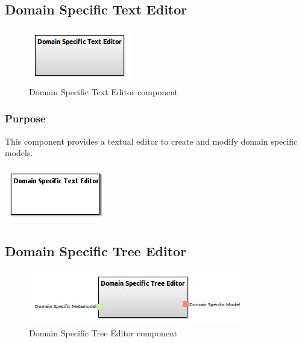 \documentclass{gemoc} %
\begin{document}
\subsection{Domain Specific Text Editor}

\begin{figure}[htp]
	\begin{center}
	\includegraphics*[trim=0.0cm 0.0cm 0cm 0.0cm, clip=true, scale=1.0]{../images/generated/Generated_Domain Specific Text Editor.jpg}
	\caption{Domain Specific Text Editor component}
	\end{center}
\end{figure}

\subsubsection{Purpose}
This component provides a textual editor to create and modify domain specific models.
\begin{center}
\includegraphics*[trim=0.0cm 0.0cm 0cm 0.0cm, clip=true]{../images/generated/Generated_Domain_Specific_Text_Editor.png}
\end{center}



\subsection{Domain Specific Tree Editor}

\begin{figure}[htp]
	\begin{center}
	\includegraphics*[trim=0.0cm 0.0cm 0cm 0.0cm, clip=true, scale=1.0]{../images/generated/Generated_Domain Specific Tree Editor.jpg}
	\caption{Domain Specific Tree Editor component}
	\end{center}
\end{figure}
\end{document}
